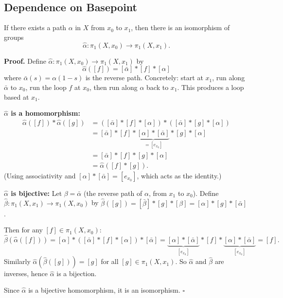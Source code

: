 \documentclass[11pt]{report}
\renewenvironment{proof}[1][Proof]{\noindent\textbf{#1.} }{\hfill$\square$\par\vspace{5pt}}
\begin{document}
\subsection{Dependence on Basepoint}

\begin{thmbox}
If there exists a path $\alpha$ in $X$ from $x_0$ to $x_1$, then there is an isomorphism of groups
\[\hat{\alpha}: \pi_1(X, x_0) \to \pi_1(X, x_1).\]
\end{thmbox}

\begin{proof}
Define $\hat{\alpha}: \pi_1(X, x_0) \to \pi_1(X, x_1)$ by
\[\hat{\alpha}([f]) = [\bar{\alpha}] * [f] * [\alpha]\]
where $\bar{\alpha}(s) = \alpha(1-s)$ is the reverse path. Concretely: start at $x_1$, run along $\bar{\alpha}$ to $x_0$, run the loop $f$ at $x_0$, then run along $\alpha$ back to $x_1$. This produces a loop based at $x_1$.

\textbf{$\hat{\alpha}$ is a homomorphism:}
\begin{align*}
\hat{\alpha}([f]) * \hat{\alpha}([g]) &= ([\bar{\alpha}] * [f] * [\alpha]) * ([\bar{\alpha}] * [g] * [\alpha]) \\
&= [\bar{\alpha}] * [f] * \underbrace{[\alpha] * [\bar{\alpha}]}_{= [e_{x_0}]} * [g] * [\alpha] \\
&= [\bar{\alpha}] * [f] * [g] * [\alpha] \\
&= \hat{\alpha}([f] * [g]).
\end{align*}
(Using associativity and $[\alpha] * [\bar{\alpha}] = [e_{x_0}]$, which acts as the identity.)

\textbf{$\hat{\alpha}$ is bijective:} Let $\beta = \bar{\alpha}$ (the reverse path of $\alpha$, from $x_1$ to $x_0$). Define $\hat{\beta}: \pi_1(X, x_1) \to \pi_1(X, x_0)$ by $\hat{\beta}([g]) = [\bar{\beta}] * [g] * [\beta] = [\alpha] * [g] * [\bar{\alpha}]$.

Then for any $[f] \in \pi_1(X, x_0)$:
\[\hat{\beta}(\hat{\alpha}([f])) = [\alpha] * ([\bar{\alpha}] * [f] * [\alpha]) * [\bar{\alpha}] = \underbrace{[\alpha] * [\bar{\alpha}]}_{[e_{x_0}]} * [f] * \underbrace{[\alpha] * [\bar{\alpha}]}_{[e_{x_0}]} = [f].\]
Similarly $\hat{\alpha}(\hat{\beta}([g])) = [g]$ for all $[g] \in \pi_1(X, x_1)$. So $\hat{\alpha}$ and $\hat{\beta}$ are inverses, hence $\hat{\alpha}$ is a bijection.

Since $\hat{\alpha}$ is a bijective homomorphism, it is an isomorphism.
\end{proof}
\end{document}
